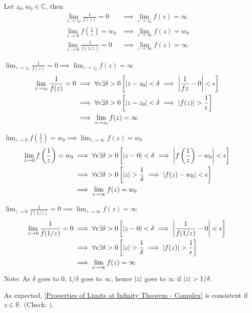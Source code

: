 \documentclass[12pt, english]{book}
\makeatletter
\renewenvironment{proof}[1][\proofname]{\par
	\pushQED{\qed}%
	\normalfont \topsep6\p@\@plus6\p@\relax
	\list{}{%
		\settowidth{\leftmargin}{\itshape\proofname:\hskip\labelsep}%
		\setlength{\labelwidth}{0pt}%
		\setlength{\itemindent}{-\leftmargin}%
		}%
	\item[\hskip\labelsep\itshape#1\@addpunct{:}]\ignorespaces
	}{\popQED\endlist\@endpefalse}
\makeatother
\begin{document}
	\begin{theorem}
		\label{Properties of Limits at Infinity Theorem - Complex}
		Let $z_0, w_0 \in \mathbb{C}$, then
		\begin{align*}
			\lim_{z \rightarrow z_0} \frac{1}{f(z)} = 0
			&\implies \lim_{z \rightarrow z_0} f(z) = \infty \\
			\lim_{z \rightarrow 0} f\left(\frac{1}{z}\right) = w_0
			&\implies \lim_{z \rightarrow \infty} f(z) = w_0 \\
			\lim_{z \rightarrow 0} \frac{1}{f(1/z)} = 0 
			&\implies \lim_{z \rightarrow \infty} f(z) = \infty
		\end{align*}
	\end{theorem}
	\begin{proof}
		\underline{$\lim_{z \rightarrow z_0} \frac{1}{f(z)} = 0 
		\implies \lim_{z \rightarrow z_0} f(z) = \infty$}
		\begin{align*}
			\lim_{z \rightarrow z_0} \frac{1}{f(z)} = 0 
			&\implies \forall \epsilon \exists \delta>0 \left[\abs{z-z_0} < \delta \implies \abs{\frac{1}{f{z}} - 0} < \epsilon \right] \\
			&\implies \forall \epsilon \exists \delta>0 \left[\abs{z-z_0} < \delta \implies \abs{f(z)} > \frac{1}{\epsilon} \right]  \\
			&\implies \lim_{z \rightarrow z_0} f(z) = \infty 
		\end{align*}
	
		\underline{$\lim_{z \rightarrow 0} f\left(\frac{1}{z}\right) = w_0
		\implies \lim_{z \rightarrow \infty} f(z) = w_0$}
		\begin{align*}
			\lim_{z \rightarrow 0} f\left(\frac{1}{z}\right) = w_0
			&\implies \forall \epsilon \exists \delta>0 \left[ \abs{z-0} < \delta \implies \abs{f\left(\frac{1}{z}\right) - w_0} < \epsilon \right] \\
			&\implies \forall \epsilon \exists \delta>0 \left[ \abs{z} > \frac{1}{\delta} \implies \abs{f(z) - w_0} < \epsilon \right] \\
			&\implies \lim_{z \rightarrow \infty} f(z) = w_0
		\end{align*}
	
		\underline{$\lim_{z \rightarrow 0} \frac{1}{f(1/z)} = 0 
		\implies \lim_{z \rightarrow \infty} f(z) = \infty$}
		\begin{align*}
			\lim_{z \rightarrow 0} \frac{1}{f(1/z)} = 0 
			&\implies \forall \epsilon \exists \delta > 0 \left[ \abs{z - 0} < \delta \implies \abs{\frac{1}{f(1/z)} - 0} < \epsilon \right] \\
			&\implies \forall \epsilon \exists \delta > 0 \left[ \abs{z} > \frac{1}{\delta} \implies \abs{f(z)} > \frac{1}{\epsilon} \right] \\
			&\implies \lim_{z \rightarrow \infty} f(z) = \infty 
		\end{align*}
	\end{proof}
	Note: As $\delta$ goes to $0$, $1/\delta$ goes to $\infty$, hence $\abs{z}$ goes to $\infty$ if $\abs{z} > 1/\delta$. 
	\begin{observation}
		As expected, \cref{Properties of Limits at Infinity Theorem - Complex} is consistent if $z \in \mathbb{R}$. (Check: ).
	\end{observation}
	
\end{document}
